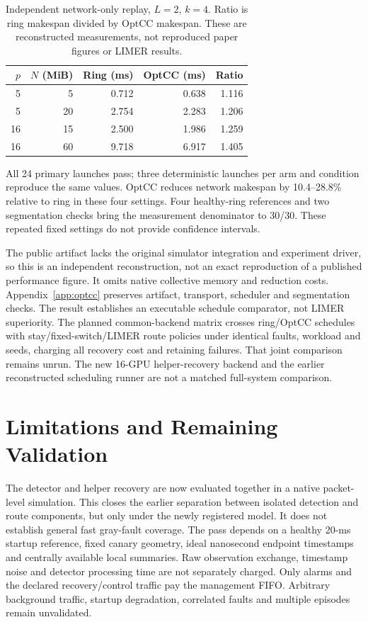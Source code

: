 \documentclass[sigconf]{acmart}
\begin{document}
\begin{table}[t]
  \caption{Independent network-only replay, $L=2$, $k=4$. Ratio is ring
  makespan divided by OptCC makespan. These are reconstructed measurements,
  not reproduced paper figures or LIMER results.}
  \label{tab:optcc-replay}
  \centering
  \small
  \begin{tabular}{@{}rrrrr@{}}
    \toprule
    $p$ & $N$ (MiB) & Ring (ms) & OptCC (ms) & Ratio \\
    \midrule
    5 & 5 & 0.712 & 0.638 & 1.116 \\
    5 & 20 & 2.754 & 2.283 & 1.206 \\
    16 & 15 & 2.500 & 1.986 & 1.259 \\
    16 & 60 & 9.718 & 6.917 & 1.405 \\
    \bottomrule
  \end{tabular}
\end{table}

All 24 primary launches pass; three deterministic launches per arm and
condition reproduce the same values. OptCC reduces network makespan by
10.4--28.8\% relative to ring in these four settings. Four healthy-ring
references and two segmentation checks bring the measurement denominator
to 30/30. These repeated fixed settings do not provide confidence intervals.

The public artifact lacks the original simulator integration and experiment
driver, so this is an independent reconstruction, not an exact reproduction
of a published performance figure. It omits native collective memory and
reduction costs. Appendix~\ref{app:optcc} preserves artifact, transport,
scheduler and segmentation checks. The result establishes an executable
schedule comparator, not LIMER superiority. The planned common-backend
matrix crosses ring/OptCC schedules with stay/fixed-switch/LIMER route
policies under identical faults, workload and seeds, charging all recovery
cost and retaining failures. That joint comparison remains unrun. The new 16-GPU helper-recovery
backend and the earlier reconstructed scheduling runner are not a matched
full-system comparison.

\section{Limitations and Remaining Validation}
\label{sec:limitations}
The detector and helper recovery are now evaluated together in a native
packet-level simulation. This closes the earlier separation between isolated
detection and route components, but only under the newly registered model.
It does not establish general fast gray-fault coverage. The pass depends on
a healthy 20-ms startup reference, fixed canary geometry, ideal nanosecond
endpoint timestamps and centrally available local summaries. Raw observation
exchange, timestamp noise and detector processing time are not separately
charged. Only alarms and the declared recovery/control traffic pay the
management FIFO. Arbitrary background traffic, startup degradation,
correlated faults and multiple episodes remain unvalidated.
\end{document}
